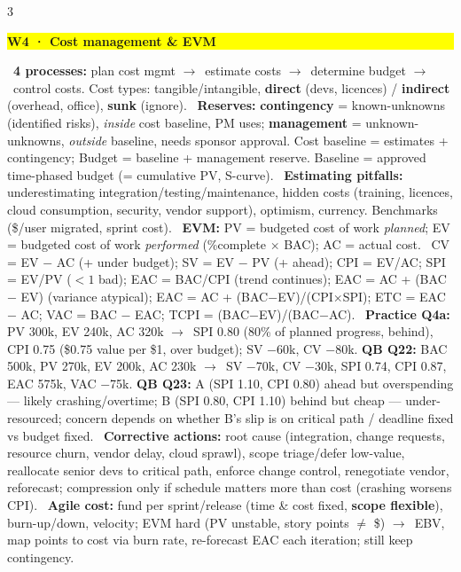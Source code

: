 \documentclass[a4paper,landscape]{article}
\newcommand{\hlhighlight}[1]{\begingroup\setlength{\fboxsep}{0pt}\colorbox{yellow}{\strut\textbf{#1}}\endgroup}
\newcommand{\concept}[1]{\textbf{#1}}
\newcommand{\lbl}[1]{\textbf{#1}}
\newcommand{\kh}[1]{{\setlength{\fboxsep}{0.5pt}\colorbox{keyhlcolor}{#1}}}
\newcommand{\ra}{$\rightarrow$}
\begin{document}
\begin{multicols}{3}
\par\smallskip\noindent\hlhighlight{W4 · Cost management \& EVM}\ \concept{4 processes:} plan cost mgmt \ra\ estimate costs \ra\ determine budget \ra\ control costs. Cost types: tangible/intangible, \lbl{direct} (devs, licences) / \lbl{indirect} (overhead, office), \lbl{sunk} (ignore). \textbullet\ \concept{Reserves:} \lbl{contingency} = known-unknowns (identified risks), \emph{inside} cost baseline, PM uses; \lbl{management} = unknown-unknowns, \emph{outside} baseline, needs sponsor approval. \kh{Cost baseline = estimates + contingency}; \kh{Budget = baseline + management reserve}. Baseline = approved time-phased budget (= cumulative PV, S-curve). \textbullet\ \concept{Estimating pitfalls:} underestimating integration/testing/maintenance, hidden costs (training, licences, cloud consumption, security, vendor support), optimism, currency. Benchmarks (\$/user migrated, sprint cost). \textbullet\ \concept{EVM:} PV = budgeted cost of work \emph{planned}; EV = budgeted cost of work \emph{performed} (\%complete $\times$ BAC); AC = actual cost. \textbullet\ \kh{CV = EV $-$ AC} (+ under budget); \kh{SV = EV $-$ PV} (+ ahead); \kh{CPI = EV/AC}; \kh{SPI = EV/PV} ($<1$ bad); \kh{EAC = BAC/CPI} (trend continues); EAC = AC + (BAC $-$ EV) (variance atypical); EAC = AC + (BAC$-$EV)/(CPI$\times$SPI); ETC = EAC $-$ AC; \kh{VAC = BAC $-$ EAC}; TCPI = (BAC$-$EV)/(BAC$-$AC). \textbullet\ \lbl{Practice Q4a:} PV 300k, EV 240k, AC 320k \ra\ \kh{SPI 0.80} (80\% of planned progress, behind), \kh{CPI 0.75} (\$0.75 value per \$1, over budget); SV $-$60k, CV $-$80k. \lbl{QB Q22:} BAC 500k, PV 270k, EV 200k, AC 230k \ra\ SV $-$70k, CV $-$30k, SPI 0.74, CPI 0.87, EAC 575k, VAC $-$75k. \lbl{QB Q23:} A (SPI 1.10, CPI 0.80) ahead but overspending --- likely crashing/overtime; B (SPI 0.80, CPI 1.10) behind but cheap --- under-resourced; concern depends on whether B's slip is on critical path / deadline fixed vs budget fixed. \textbullet\ \concept{Corrective actions:} root cause (integration, change requests, resource churn, vendor delay, cloud sprawl), scope triage/defer low-value, reallocate senior devs to critical path, enforce change control, renegotiate vendor, reforecast; compression only if schedule matters more than cost (crashing worsens CPI). \textbullet\ \concept{Agile cost:} fund per sprint/release (time \& cost fixed, \lbl{scope flexible}), burn-up/down, velocity; EVM hard (PV unstable, story points $\ne$ \$) \ra\ EBV, map points to cost via burn rate, re-forecast EAC each iteration; still keep contingency.\par


\end{multicols}
\end{document}
